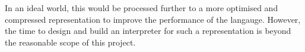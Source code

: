 \documentclass{l4proj}
\begin{document}
In an ideal world, this would be processed further to a more optimised and compressed representation to improve the performance of the langauge.
However, the time to design and build an interpreter for such a representation is beyond the reasonable scope of this project.


\end{document}
